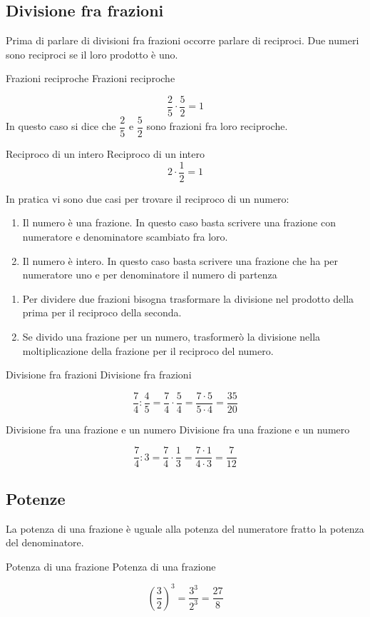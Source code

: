 	 \subsection{Divisione fra frazioni}
Prima di parlare di divisioni fra frazioni occorre parlare di reciproci. Due numeri sono reciproci se il loro prodotto è uno.
\begin{esempiot}{Frazioni reciproche}{}
 Frazioni reciproche
 \end{esempiot}
 \[\dfrac{2}{5}\cdot\dfrac{5}{2}=1\]In questo caso si dice che $\dfrac{2}{5}$ e $\dfrac{5}{2}$ sono frazioni fra loro reciproche.
\begin{esempiot}{Reciproco di un intero}{}
Reciproco di un intero \[2\cdot\dfrac{1}{2}=1\]
\end{esempiot}
In pratica  vi sono due casi per trovare il reciproco di un numero:
\begin{enumerate}
	\item Il numero è una frazione. In questo caso basta scrivere una frazione con numeratore e denominatore scambiato fra loro.
	\item Il numero è  intero. In questo caso basta scrivere una frazione che ha per numeratore uno e per denominatore il numero di partenza 
\end{enumerate}
\begin{enumerate}
\item Per dividere due frazioni bisogna trasformare la divisione nel prodotto della prima per il reciproco della seconda.
\item Se divido una frazione per un numero, trasformerò la divisione nella moltiplicazione della frazione per il reciproco del numero.
\end{enumerate}
\begin{esempiot}{Divisione fra frazioni}{}
Divisione fra frazioni
\end{esempiot}
\[\dfrac{7}{4}:\dfrac{4}{5}=\dfrac{7}{4}\cdot\dfrac{5}{4}=\dfrac{7\cdot 5}{5\cdot 4}=\dfrac{35}{20}\]
\begin{esempiot}{Divisione fra una frazione e un numero}{}
Divisione fra una frazione e un numero
\end{esempiot}
\[\dfrac{7}{4}:3=\dfrac{7}{4}\cdot\dfrac{1}{3}=\dfrac{7\cdot 1}{4\cdot 3}=\dfrac{7}{12} \]

\subsection{Potenze}
La potenza di una frazione è uguale alla potenza del numeratore fratto la potenza del denominatore.
\begin{esempiot}{Potenza di una frazione}{}
Potenza di una frazione
\end{esempiot}
\[\left( \dfrac{3}{2}\right)^3=\dfrac{3^3}{2^3}=\dfrac{27}{8} \]



